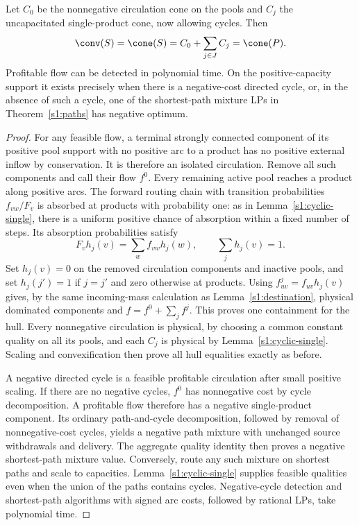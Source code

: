 \begin{theorem}\label{s1:cyclic-sign}
Let $C_0$ be the nonnegative circulation cone on the pools and $C_j$
the uncapacitated single-product cone, now allowing cycles. Then
\[
 \conv(S)=\cone(S)=C_0+\sum_{j\in J}C_j=\cone(P).
\]
Profitable flow can be detected in polynomial time. On the
positive-capacity support it exists precisely when there is a
negative-cost directed cycle, or, in the absence of such a cycle,
one of the shortest-path mixture LPs in Theorem~\ref{s1:paths} has
negative optimum.
\end{theorem}
\begin{proof}
For any feasible flow, a terminal strongly connected component of its
positive pool support with no positive arc to a product has no positive
external inflow by conservation. It is therefore an isolated circulation.
Remove all such components and call their flow $f^0$. Every remaining
active pool reaches a product along positive arcs. The forward routing
chain with transition probabilities $f_{vw}/F_v$ is absorbed at products
with probability one: as in Lemma~\ref{s1:cyclic-single}, there is a
uniform positive chance of absorption within a fixed number of steps.
Its absorption probabilities satisfy
\[
 F_vh_j(v)=\sum_wf_{vw}h_j(w),\qquad\sum_jh_j(v)=1.
\]
Set $h_j(v)=0$ on the removed circulation components and inactive pools,
and set $h_j(j')=1$ if $j=j'$ and zero otherwise at products.
Using $f^j_{uv}=f_{uv}h_j(v)$ gives, by the same incoming-mass
calculation as Lemma~\ref{s1:destination}, physical dominated components
and $f=f^0+\sum_jf^j$. This proves one containment for the hull.
Every nonnegative circulation is physical, by choosing a common constant
quality on all its pools, and each $C_j$ is physical by
Lemma~\ref{s1:cyclic-single}. Scaling and convexification then prove all
hull equalities exactly as before.

A negative directed cycle is a feasible profitable circulation after
small positive scaling. If there are no negative cycles, $f^0$ has
nonnegative cost by cycle decomposition. A profitable flow therefore
has a negative single-product component. Its ordinary path-and-cycle
decomposition, followed by removal of nonnegative-cost cycles, yields
a negative path mixture with unchanged source withdrawals and delivery.
The aggregate quality identity then proves a negative shortest-path
mixture value. Conversely, route any such mixture on shortest paths
and scale to capacities. Lemma~\ref{s1:cyclic-single} supplies feasible
qualities even when the union of the paths contains cycles. Negative-cycle
detection and shortest-path algorithms with signed arc costs, followed
by rational LPs, take polynomial time.
\end{proof}

